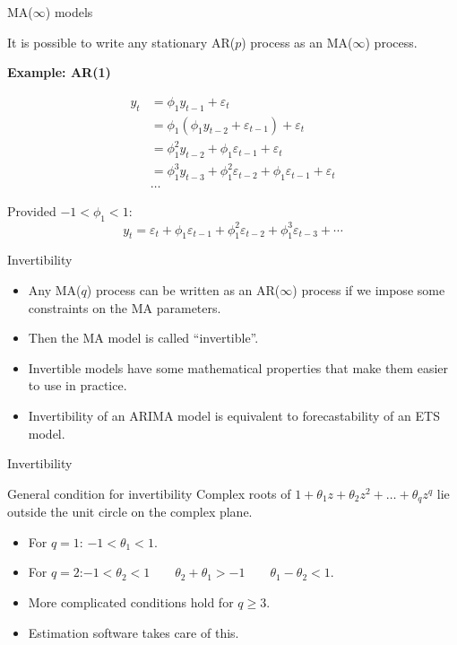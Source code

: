 \documentclass[14pt,ignorenonframetext,]{beamer}
\providecommand{\tightlist}{%
  \setlength{\itemsep}{0pt}\setlength{\parskip}{0pt}}
\begin{document}
\begin{frame}{MA(\(\infty\)) models}

It is possible to write any stationary AR(\(p\)) process as an
MA(\(\infty\)) process.

\textbf{Example: AR(1)}

\begin{align*}
y_t &= \phi_1y_{t-1} + \varepsilon_t\\
&= \phi_1(\phi_1y_{t-2} + \varepsilon_{t-1}) + \varepsilon_t\\
&= \phi_1^2y_{t-2} + \phi_1 \varepsilon_{t-1} + \varepsilon_t\\
&= \phi_1^3y_{t-3} + \phi_1^2\varepsilon_{t-2} + \phi_1 \varepsilon_{t-1} + \varepsilon_t\\
&\dots
\end{align*}

\pause
Provided \(-1 < \phi_1 < 1\):
\[ y_t = \varepsilon_t + \phi_1 \varepsilon_{t-1} + \phi_1^2 \varepsilon_{t-2} + \phi_1^3 \varepsilon_{t-3} + \cdots
\]

\end{frame}

\begin{frame}{Invertibility}

\begin{itemize}
\tightlist
\item
  Any MA(\(q\)) process can be written as an AR(\(\infty\)) process if
  we impose some constraints on the MA parameters.
\item
  Then the MA model is called ``invertible''.
\item
  Invertible models have some mathematical properties that make them
  easier to use in practice.
\item
  Invertibility of an ARIMA model is equivalent to forecastability of an
  ETS model.
\end{itemize}

\end{frame}

\begin{frame}{Invertibility}

\begin{block}{General condition for invertibility}
Complex roots of $1+\theta_1 z + \theta_2 z^2 + \dots + \theta_qz^q$ lie outside the unit circle on the complex plane.
\end{block}

\pause

\begin{itemize}
\tightlist
\item
  For \(q=1\): \(-1<\theta_1<1\).
\item
  For
  \(q=2\):\newline \(-1<\theta_2<1\qquad \theta_2+\theta_1 >-1 \qquad \theta_1 -\theta_2 < 1\).
\item
  More complicated conditions hold for \(q\ge3\).
\item
  Estimation software takes care of this.
\end{itemize}

\end{frame}
\end{document}
